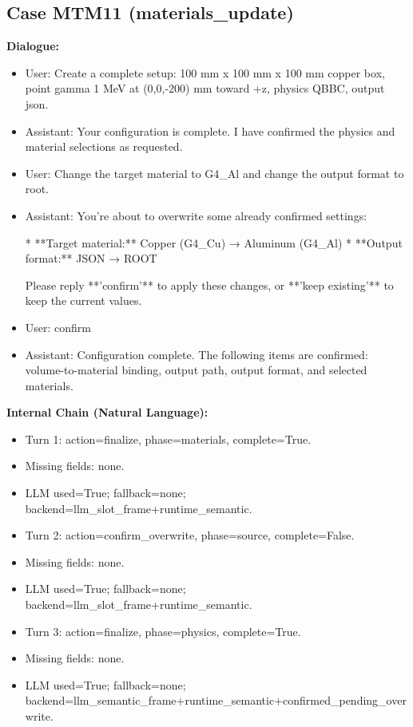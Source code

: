 \documentclass[11pt]{ctexart}
\begin{document}
\subsection{Case MTM11 (materials\_update)}
\textbf{Dialogue:}
\begin{itemize}
\item User: Create a complete setup: 100 mm x 100 mm x 100 mm copper box, point gamma 1 MeV at (0,0,-200) mm toward +z, physics QBBC, output json.
\item Assistant: Your configuration is complete. I have confirmed the physics and material selections as requested.
\item User: Change the target material to G4\_Al and change the output format to root.
\item Assistant: You're about to overwrite some already confirmed settings:

*   **Target material:** Copper (G4\_Cu) → Aluminum (G4\_Al)
*   **Output format:** JSON → ROOT

Please reply **'confirm'** to apply these changes, or **'keep existing'** to keep the current values.
\item User: confirm
\item Assistant: Configuration complete. The following items are confirmed: volume-to-material binding, output path, output format, and selected materials.
\end{itemize}
\textbf{Internal Chain (Natural Language):}
\begin{itemize}
\item Turn 1: action=finalize, phase=materials, complete=True.
\item Missing fields: none.
\item LLM used=True; fallback=none; backend=llm\_slot\_frame+runtime\_semantic.
\item Turn 2: action=confirm\_overwrite, phase=source, complete=False.
\item Missing fields: none.
\item LLM used=True; fallback=none; backend=llm\_slot\_frame+runtime\_semantic.
\item Turn 3: action=finalize, phase=physics, complete=True.
\item Missing fields: none.
\item LLM used=True; fallback=none; backend=llm\_semantic\_frame+runtime\_semantic+confirmed\_pending\_overwrite.
\end{itemize}
\end{document}
